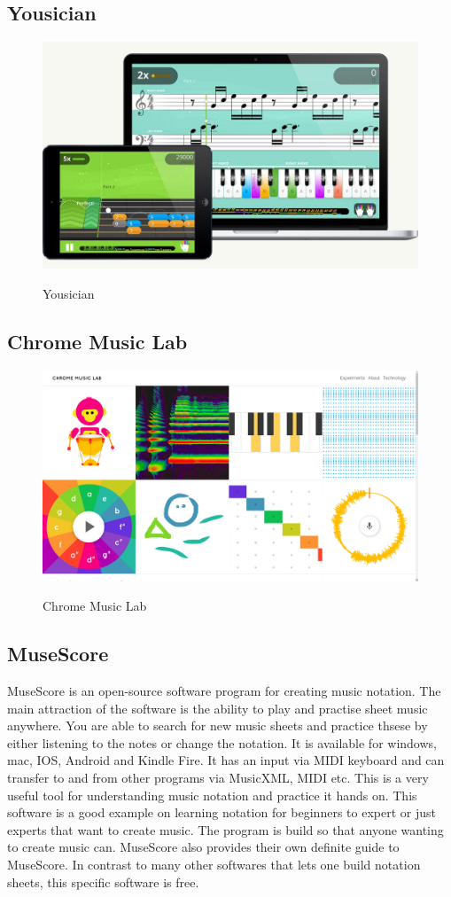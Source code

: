 	\subsection{Yousician}
		\begin{figure}[H]
			\centering
			\includegraphics[width=0.8\linewidth]{figure/Analysis/yousician.jpg}
			\label{fig:yousician}
			\caption{Yousician}
		\end{figure}
	\subsection{Chrome Music Lab}
		\begin{figure}[H]
			\centering
			\includegraphics[width=0.8\linewidth]{figure/Analysis/chromeMusicLab.png}
			\label{fig:chromeMusicLab}
			\caption{Chrome Music Lab}
		\end{figure}

	\subsection{MuseScore}
	MuseScore is an open-source software program for creating music notation. The main attraction of the software is the ability to play and practise sheet music anywhere. You are able to search for new music sheets and practice thsese by either listening to the notes or change the notation. It is available for windows, mac, IOS, Android and Kindle Fire. It has an input via MIDI keyboard and can transfer to and from other programs via MusicXML, MIDI etc. This is a very useful tool for understanding music notation and practice it hands on. This software is a good example on learning notation for beginners to expert or just experts that want to create music. The program is build so that anyone wanting to create music can. MuseScore also provides their own definite guide to MuseScore. In contrast to many other softwares that lets one build notation sheets, this specific software is free. 
	
